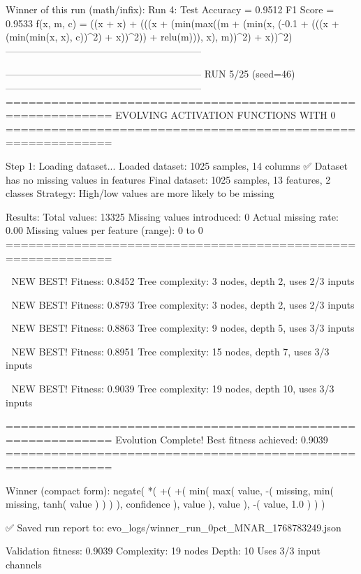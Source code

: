 Winner of this run (math/infix):
  Run 4:
     Test Accuracy = 0.9512
     F1 Score      = 0.9533
     f(x, m, c)    = ((x + x) + (((x + (min(max((m + (min(x, (-0.1 + (((x + (min(min(x, x), c))^2) + x))^2)) + relu(m))), x), m))^2) + x))^2)
------------------------------------------------------------

------------------------------------------------------------
RUN 5/25 (seed=46)
------------------------------------------------------------
============================================================
EVOLVING ACTIVATION FUNCTIONS
WITH 0%
============================================================

Step 1: Loading dataset...
Loaded dataset: 1025 samples, 14 columns
✅ Dataset has no missing values in features
Final dataset: 1025 samples, 13 features, 2 classes
Strategy: High/low values are more likely to be missing

Results:
  Total values: 13325
  Missing values introduced: 0
  Actual missing rate: 0.00%
  Missing values per feature (range): 0 to 0
============================================================


🎯 NEW BEST! Fitness: 0.8452
Tree complexity: 3 nodes, depth 2, uses 2/3 inputs

🎯 NEW BEST! Fitness: 0.8793
Tree complexity: 3 nodes, depth 2, uses 2/3 inputs

🎯 NEW BEST! Fitness: 0.8863
Tree complexity: 9 nodes, depth 5, uses 3/3 inputs

🎯 NEW BEST! Fitness: 0.8951
Tree complexity: 15 nodes, depth 7, uses 3/3 inputs

🎯 NEW BEST! Fitness: 0.9039
Tree complexity: 19 nodes, depth 10, uses 3/3 inputs

============================================================
Evolution Complete!
Best fitness achieved: 0.9039
============================================================

Winner (compact form):
 negate(
  *(
    +(
      +(
        min(
          max(
            value,
            -(
              missing,
              min(
                missing,
                tanh(
                  value
                )
              )
            )
          ),
          confidence
        ),
        value
      ),
      value
    ),
    -(
      value,
      1.0
    )
  )
)

✅ Saved run report to: evo_logs/winner_run_0pct_MNAR_1768783249.json

Validation fitness: 0.9039
Complexity: 19 nodes
Depth: 10
Uses 3/3 input channels

